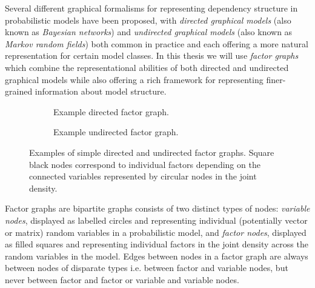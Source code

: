 Several different graphical formalisms for representing dependency structure in probabilistic models have been proposed, with \emph{directed graphical models} \citep{pearl1988probabilistic} (also known as \emph{Bayesian networks}) and \emph{undirected graphical models} \citep{kindermann1980markov} (also known as \emph{Markov random fields}) both common in practice and each offering a more natural representation for certain model classes. In this thesis we will use \emph{factor graphs} \citep{frey1997factor,frey2002extending} which combine the representational abilities of both directed and undirected graphical models while also offering a rich framework for representing finer-grained information about model structure.

\begin{figure}[t]
\centering
\begin{subfigure}[b]{.45\linewidth}
\vskip 0pt
\centering
{}
\caption{Example directed factor graph.}
\label{sfig:example-directed-factor-graph}
\end{subfigure}%
 \hspace*{\fill}
\begin{subfigure}[b]{.5\linewidth}
\vskip 0pt
\centering
{}
\caption{Example undirected factor graph.}
\label{sfig:example-undirected-factor-graph}
\end{subfigure}%
\caption[Factor graph examples.]{Examples of simple directed and undirected factor graphs. Square black nodes correspond to individual factors depending on the connected variables represented by circular nodes in the joint density.}
\label{fig:example-factor-graphs}
\end{figure}

Factor graphs are bipartite graphs consists of two distinct types of nodes: \emph{variable nodes}, displayed as labelled circles and representing individual (potentially vector or matrix) random variables in a probabilistic model, and \emph{factor nodes}, displayed as filled squares and representing individual factors in the joint density across the random variables in the model. Edges between nodes in a factor graph are always between nodes of disparate types i.e. between factor and variable nodes, but never between factor and factor or variable and variable nodes.

